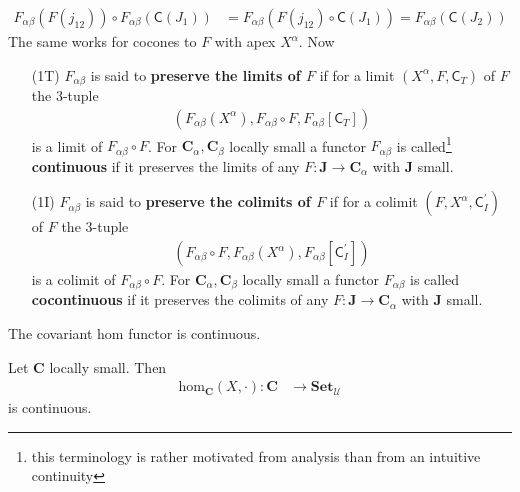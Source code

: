 \begin{align*}
  F_{\alpha\beta}(F(j_{12}))
  \circ
  F_{\alpha\beta}(\mathsf{C}(J_{1}))
  &=
  F_{\alpha\beta}
  \left(
    F(j_{12})
    \circ
    \mathsf{C}(J_{1})
  \right)
  =
  F_{\alpha\beta}(\mathsf{C}(J_{2}))
\end{align*}
The same works for cocones to $F$ with apex $X^{\alpha}$. Now
\begin{enumerate}
\item[(1T)]
$F_{\alpha\beta}$ is said to \textbf{preserve the limits of $F$} if for a limit $(X^{\alpha},F,\mathsf{C}_{T})$ of $F$ the $3$-tuple
\begin{align*}
  \left(
    F_{\alpha\beta}(X^{\alpha}),
    F_{\alpha\beta} \circ F,
    F_{\alpha\beta}[\mathsf{C}_{T}]
  \right)
\end{align*}
is a limit of $F_{\alpha\beta} \circ F$. For $\mathbf{C}_{\alpha},\mathbf{C}_{\beta}$ locally small a functor $F_{\alpha\beta}$ is called\footnote{this terminology is rather motivated from analysis than from an intuitive continuity} \textbf{continuous} if it preserves the limits of any $F \colon \mathbf{J} \rightarrow \mathbf{C}_{\alpha}$ with $\mathbf{J}$ small.
\item[(1I)]
$F_{\alpha\beta}$ is said to \textbf{preserve the colimits of $F$} if for a colimit $(F,X^{\alpha},\mathsf{C}_{I}^{\prime})$ of $F$ the $3$-tuple
\begin{align*}
  \left(
    F_{\alpha\beta} \circ F,
    F_{\alpha\beta}(X^{\alpha}),
    F_{\alpha\beta}[\mathsf{C}_{I}^{\prime}]
  \right)
\end{align*}
is a colimit of $F_{\alpha\beta} \circ F$. For $\mathbf{C}_{\alpha},\mathbf{C}_{\beta}$ locally small a functor $F_{\alpha\beta}$ is called \textbf{cocontinuous} if it preserves the colimits of any $F \colon \mathbf{J} \rightarrow \mathbf{C}_{\alpha}$ with $\mathbf{J}$ small.
\end{enumerate}
The covariant hom functor is continuous.
\\
\begin{thm}
\label{thm:cohomiscont}
Let $\mathbf{C}$ locally small. Then
\begin{align*}
  \mathrm{hom}_{\mathbf{C}}(X,\cdot)
  \colon
  \mathbf{C}
  &\rightarrow
  \mathbf{Set}_{\mathcal{U}}
\end{align*}
is continuous.
\end{thm}
